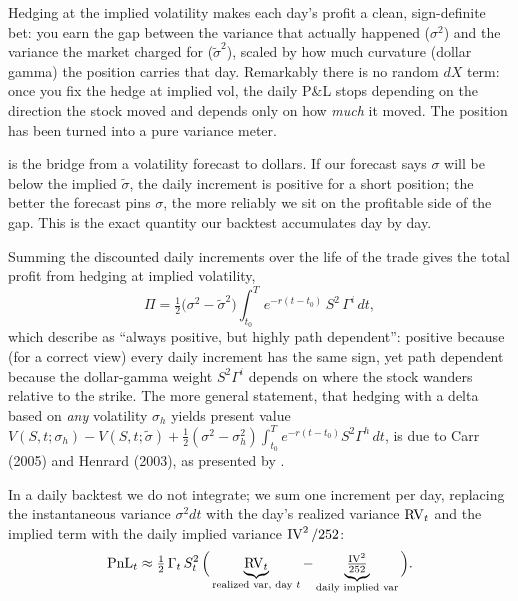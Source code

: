 \begin{intuition}
Hedging at the implied volatility makes each day's profit a clean, sign-definite bet: you earn the gap between the variance that actually happened ($\sigma^2$) and the variance the market charged for ($\tilde{\sigma}^2$), scaled by how much curvature (dollar gamma) the position carries that day. Remarkably there is no random $dX$ term: once you fix the hedge at implied vol, the daily P\&L stops depending on the direction the stock moved and depends only on how \emph{much} it moved. The position has been turned into a pure variance meter.
\end{intuition}

\begin{projectconnection}
 is the bridge from a volatility forecast to dollars. If our forecast says $\sigma$ will be below the implied $\tilde{\sigma}$, the daily increment is positive for a short position; the better the forecast pins $\sigma$, the more reliably we sit on the profitable side of the gap. This is the exact quantity our backtest accumulates day by day.
\end{projectconnection}

Summing the discounted daily increments over the life of the trade gives the total profit from hedging at implied volatility,
\begin{equation}
\label{eq:ivrv:aw-total}
\Pi = \tfrac{1}{2}\big(\sigma^2 - \tilde{\sigma}^2\big)\int_{t_0}^{T} e^{-r(t-t_0)}\, S^2\,\Gamma^{i}\,dt ,
\end{equation}
which \citet{AhmadWilmott2005} describe as ``always positive, but highly path dependent'': positive because (for a correct view) every daily increment has the same sign, yet path dependent because the dollar-gamma weight $S^2\Gamma^{i}$ depends on where the stock wanders relative to the strike. The more general statement, that hedging with a delta based on \emph{any} volatility $\sigma_h$ yields present value $V(S,t;\sigma_h) - V(S,t;\tilde{\sigma}) + \tfrac{1}{2}(\sigma^2-\sigma_h^2)\int_{t_0}^{T} e^{-r(t-t_0)}S^2\Gamma^{h}\,dt$, is due to Carr (2005) and Henrard (2003), as presented by \citet{AhmadWilmott2005}.

In a daily backtest we do not integrate; we sum one increment per day, replacing the instantaneous variance $\sigma^2 dt$ with the day's realized variance $\operatorname{RV}_t$ and the implied term with the daily implied variance $\operatorname{IV}^2/252$:
\begin{equation}
\label{eq:ivrv:daily-discrete}
\text{PnL}_t \approx \tfrac{1}{2}\,\Gamma_t\,S_t^2\,\Big(\underbrace{\operatorname{RV}_t}_{\text{realized var, day }t} - \underbrace{\tfrac{\operatorname{IV}^2}{252}}_{\text{daily implied var}}\Big).
\end{equation}

